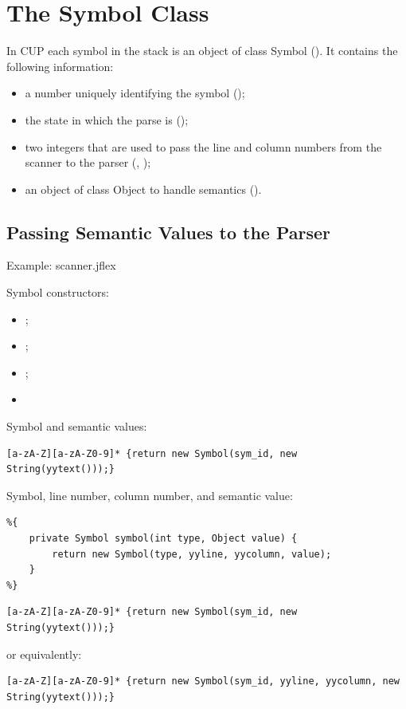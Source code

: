 \section{The Symbol Class}
In CUP each symbol in the stack is an object of class Symbol ().
It contains the following information:
\begin{itemize}
    \item
    a number uniquely identifying the symbol ();
    \item
    the state in which the parse is ();
    \item
    two integers that are used to pass the line and column numbers from the scanner to the parser (, );
    \item
    an object of class Object to handle semantics ().
\end{itemize}

\subsection{Passing Semantic Values to the Parser}
Example: scanner.jflex

Symbol constructors:
\begin{itemize}
    \item
    ;
    \item
    ;
    \item
    ;
    \item
\end{itemize}
Symbol and semantic values:
\begin{lstlisting}
[a-zA-Z][a-zA-Z0-9]* {return new Symbol(sym_id, new String(yytext()));}
\end{lstlisting}
Symbol, line number, column number, and semantic value:
\begin{lstlisting}
%{
    private Symbol symbol(int type, Object value) {
        return new Symbol(type, yyline, yycolumn, value);
    }
%}
\end{lstlisting}

\begin{lstlisting}
[a-zA-Z][a-zA-Z0-9]* {return new Symbol(sym_id, new String(yytext()));}
\end{lstlisting}
or equivalently:
\begin{lstlisting}
[a-zA-Z][a-zA-Z0-9]* {return new Symbol(sym_id, yyline, yycolumn, new String(yytext()));}
\end{lstlisting}

